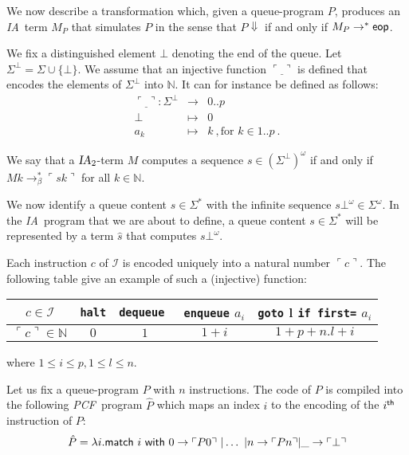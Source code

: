 \documentclass{article}
\newcommand\nat{\mathbb{N}}
\newcommand\eop{{\sf eop}}
\newcommand{\betared}{\rightarrow_\beta}
\newcommand{\encode}[1]{\ulcorner #1 \urcorner}
\newcommand\ialgol{{\textsl{IA}}}
\newcommand\pcf{\textsl{PCF}}
\begin{document}
We now describe a transformation which, given a queue-program $P$, produces an \ialgol\ term $M_P$ that simulates $P$ in the sense that $P \Downarrow$ if and only if $M_P \rightarrow^* \eop$.

We fix a distinguished element $\bot$ denoting the end of the queue. Let $\Sigma^\bot = \Sigma \cup \{ \bot \}$. We assume that an injective function $\encode{\underline{\ }}$ is defined that encodes  the
elements of $\Sigma^\bot$ into $\nat$. It can for instance be defined as follows:
\begin{eqnarray*}
\encode{\underline{\ }} : \Sigma^\bot &\longrightarrow& 0..p \\
 \bot &\mapsto& 0 \\
 a_k &\mapsto& k \ , \mbox{for } k \in 1..p \ .
\end{eqnarray*}

We say that a $\ialgol_2$-term $M$ computes a sequence $s \in {(\Sigma^\bot)}^\omega$ if and only if 
$M k \betared^* \encode{s k}$ for all $k\in \nat$.

We now identify a queue content $s \in \Sigma^*$ with the infinite sequence $s \bot^\omega \in \Sigma^\omega$. In the \ialgol\ program that we are about to define, a queue content $s \in \Sigma^*$ will be represented by a term $\hat{s}$ that computes $s \bot^\omega$.

Each instruction $c$ of $\mathcal{I}$ is encoded uniquely into a natural number $\encode{ c }$. The following table give an example of such a (injective) function:
\begin{center}
\begin{tabular}{c|c|c|c|c}
$c \in \mathcal{I}$ & {\tt halt} & {\tt dequeue } & {\tt enqueue} $a_i$ &  {\tt goto} l {\tt if first=} $a_i$ \\ \hline
$\encode{ c } \in \nat$ & $0$ & $1$ & $1+i$ & $1+p + n.l +i$ \\
\end{tabular} 
\end{center}
where $1 \leq i \leq p, 1 \leq l \leq n$.

Let us fix a queue-program $P$ with $n$ instructions. 
The code of $P$ is compiled into the following \pcf\ program $\hat{P}$
which maps an index $i$ to the encoding of the $i^{\sf th}$ instruction of $P$:
\begin{equation}
\hat{P} = \lambda i .  {\sf match\ } i {\sf \ with\ } 
   0 \rightarrow \encode{ P 0 } 
  \ | \ldots \ | n \rightarrow \encode{ P n }  | \_ \rightarrow \encode{\bot}
\end{equation} 
\end{document}
